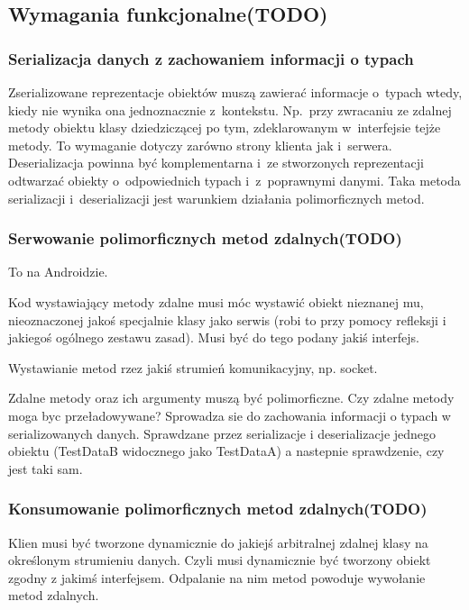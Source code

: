 \subsection{Wymagania funkcjonalne(TODO)}

\subsubsection{Serializacja danych z zachowaniem informacji o typach}
Zserializowane reprezentacje obiektów muszą zawierać informacje o~typach wtedy, kiedy nie wynika ona jednoznacznie z~kontekstu.
Np.\ przy zwracaniu ze zdalnej metody obiektu klasy dziedziczącej po tym, zdeklarowanym w~interfejsie tejże metody.
To wymaganie dotyczy zarówno strony klienta jak i~serwera.
Deserializacja powinna być komplementarna i~ze stworzonych reprezentacji odtwarzać obiekty o~odpowiednich typach i~z~poprawnymi danymi.
Taka metoda serializacji i~deserializacji jest warunkiem działania polimorficznych metod.

\subsubsection{Serwowanie polimorficznych metod zdalnych(TODO)}
To na Androidzie.

Kod wystawiający metody zdalne musi móc wystawić obiekt nieznanej mu, nieoznaczonej jakoś specjalnie klasy jako serwis (robi to przy pomocy refleksji i jakiegoś ogólnego zestawu zasad). Musi być do tego podany jakiś interfejs.

Wystawianie metod rzez jakiś strumień komunikacyjny, np. socket.


Zdalne metody oraz ich argumenty muszą być polimorficzne.
Czy zdalne metody moga byc przeładowywane?
Sprowadza sie do zachowania informacji o typach
w serializowanych danych. Sprawdzane przez serializacje
i deserializacje jednego obiektu (TestDataB widocznego
jako TestDataA) a nastepnie sprawdzenie,
czy jest taki sam.

\subsubsection{Konsumowanie polimorficznych metod zdalnych(TODO)}
Klien musi być tworzone dynamicznie do jakiejś arbitralnej zdalnej klasy na określonym strumieniu danych. Czyli musi dynamicznie być tworzony obiekt zgodny z jakimś interfejsem. Odpalanie na nim metod powoduje wywołanie metod zdalnych.

